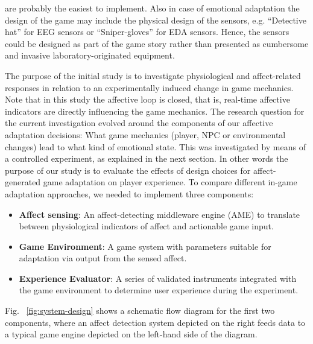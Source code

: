 are probably the easiest to implement. Also in case of emotional adaptation the design of the game may include the physical design of the sensors, e.g. “Detective hat” for EEG sensors or “Sniper-gloves” for EDA sensors. Hence, the sensors could be designed as part of the game story rather than presented as cumbersome and invasive laboratory-originated equipment.

The purpose of the initial study is to investigate physiological and affect-related responses in relation to an experimentally induced change in game mechanics. Note that in this study the affective loop is closed, that is, real-time affective indicators are directly influencing the game mechanics. The research question for the current investigation evolved around the components of our affective adaptation decisions: What game mechanics (player, NPC or environmental changes) lead to what kind of emotional state. This was investigated by means of a controlled experiment, as explained in the next section. In other words the purpose of our study is to evaluate the effects of design choices for affect-generated game adaptation on player experience. To compare different in-game adaptation approaches, we needed to implement three components:

\begin{itemize}
\item \textbf{Affect sensing}: An affect-detecting middleware engine (AME) to translate between physiological indicators of affect and actionable game input.
\item \textbf{Game Environment}: A game system with parameters suitable for adaptation via output from the sensed affect.
\item \textbf{Experience Evaluator}: A series of validated instruments integrated with the game environment to determine user experience during the experiment.
\end{itemize}

Fig. ~\ref{fig:system-design} shows a schematic flow diagram for the first two components, where an affect detection system depicted on the right feeds data to a typical game engine depicted on the left-hand side of the diagram.

